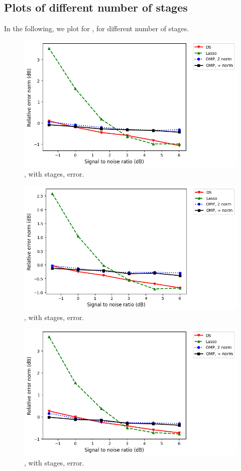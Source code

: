 \subsection {Plots of different number of stages}

In the following, we plot for , for different number of stages.
%
\begin {figure} [H]
\includegraphics [width = \textwidth] {error-medium-more-square-three-usual.png}
\caption {, with  stages, error.}
\end {figure}
%
\begin {figure} [H]
\includegraphics [width = \textwidth] {error-medium-more-wide-three-usual.png}
\caption {, with  stages, error.}
\end {figure}
%
\begin {figure} [H]
\includegraphics [width = \textwidth] {error-medium-more-tall-three-usual.png}
\caption {, with  stages, error.}
\end {figure}
